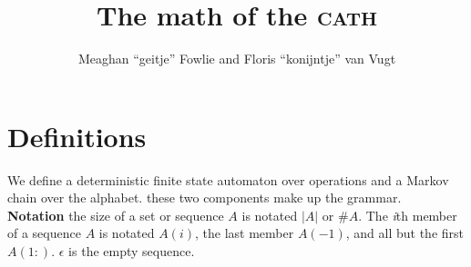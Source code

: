 \documentclass[12pt]{article}
\title{The math of the \textsc{cath}}
\author{Meaghan ``geitje'' Fowlie and Floris ``konijntje'' van Vugt}
\theoremstyle{definition}
\begin{document}
\maketitle

\section{Definitions}



\newcommand\STATES{\ensuremath{\mathbb{S}}\xspace}
\newcommand\OPS{\ensuremath{\mathbb{O}}\xspace}
\newcommand\BIGR{\ensuremath{\mathbb{B}}\xspace}
\newcommand\FSA{\textsc{FSA}\xspace}
\newcommand\PARSES{\ensuremath{\mathbb{P}}}
\newcommand\SC{\text{\textsc{sc}}}
\newcommand\TC{\text{\textsc{tc}}}
\newcommand\UC{\text{\textsc{uc}}}
\newcommand\BC{\text{\textsc{bc}}}
\newcommand\N{\ensuremath{\mathbb{N}}}
\newcommand\sg{\ensuremath{\Sigma}\xspace}
\newcommand\la{\ensuremath{\langle}\xspace}
\newcommand\ra{\ensuremath{\rangle}\xspace}
\newcommand\arr{\ensuremath{\rightarrow}\xspace}
\newcommand\emp{\ensuremath{\epsilon}\xspace}

\newcommand\op{\text{\textsl{op}}\xspace}
\newcommand\mg{\text{\textsl{mg}}\xspace}
\newcommand\cp{\text{\textsl{copy}}\xspace}
\newcommand\cl{\text{\textsl{clear}}\xspace}
\newcommand\ed{\text{\textsl{end}}\xspace}
\newcommand\start{\text{\textsl{start}}\xspace}


\newcommand\expr{\text{\textsl{expr}}\xspace}
\newcommand\Lex{\text{\textsl{Lex}}\xspace}
\newcommand\fea[1]{\text{\texttt{#1}}\xspace}
\newcommand\LBOUND{\ensuremath{\rtimes}}
\newcommand\RBOUND{\ensuremath{\ltimes}}
\newcommand\OURG{\text{\textsc{cath}}\xspace}


\newcommand\llb{\ensuremath{\llbracket}}
\newcommand\rrb{\ensuremath{\rrbracket}}

\newcommand\IF{\text{ if }\xspace}
\newcommand\der{\leftarrow}


We define a deterministic finite state automaton over operations and a Markov chain over the alphabet. these two components make up the grammar. \\

\noindent\textbf{Notation} the size of a set or sequence $A$ is notated $|A|$ or $\#A$. The \textit{i}th member of a sequence $A$ is notated $A(i)$, the last member $A(-1)$, and all but the first $A(1:)$. $\emp$ is the empty sequence.
\end{document}
